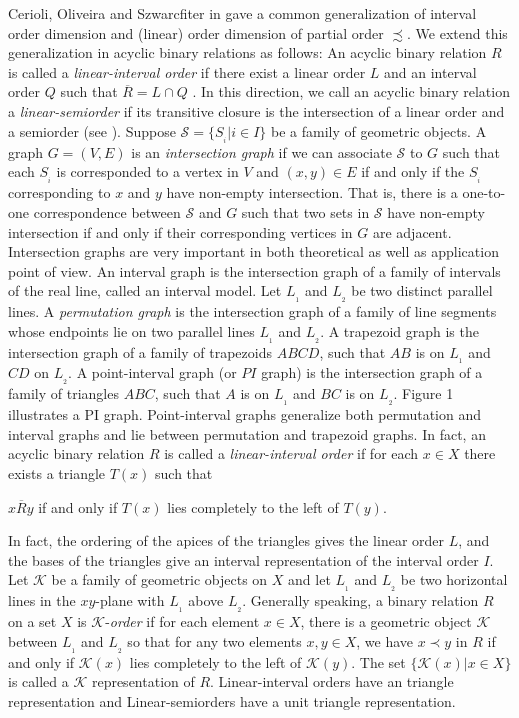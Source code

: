 \documentclass{article}
\theoremstyle{definition}
\begin{document}
Cerioli, Oliveira and Szwarcfiter in \cite{COS} gave a common generalization of
interval order dimension and (linear) order dimension of partial order $\precsim$. 
We extend this generalization in acyclic binary relations as follows: 
An acyclic binary relation $R$
is called a {\it linear-interval order} if there exist a linear order $L$ and an interval order $Q$ such that $\overline{R}=L\cap Q$ . 
In this direction,
we call an acyclic binary relation a {\it linear-semiorder} if its 
transitive closure is the intersection of a linear order and a semiorder (see \cite{tak2}).
Suppose $\mathcal{S}=\{S_{_i}\vert i\in I\}$ be a family of geometric objects.
A graph $G=(V,E)$ is an {\it intersection graph} if we can associate $\mathcal{S}$ to $G$
such that each $S_{_i}$ is corresponded to a vertex in $V$ and $(x, y)\in E$ if and only if the $S_{_i}$ corresponding to $x$ and $y$ have non-empty intersection. 
That is, there is a one-to-one correspondence between $\mathcal{S}$ and $G$ such that two sets in $\mathcal{S}$ have non-empty intersection if and only if their corresponding vertices in $G$ are adjacent.  
Intersection graphs are very important in both theoretical as well as application point of view. An interval graph is the intersection graph of a family of intervals of the real line, called an interval model. 
Let $L_{_1}$ and $L_{_2}$ be two distinct parallel lines. A {\it permutation graph} 
is the intersection graph of a family of line segments
whose endpoints lie on two parallel lines $L_{_1}$ and $L_{_2}$.
A trapezoid graph is the intersection graph of a family of trapezoids $ABCD$, such that $AB$ is on 
$L_{_1}$ and $CD$ on $L_{_2}$.
A point-interval graph (or $PI$ graph) is the intersection graph of 
a family of triangles $ABC$, such that $A$ is on $L_{_1}$ and $BC$ is on $L_{_2}$. 
Figure 1 illustrates a PI graph.
Point-interval graphs
generalize both permutation and interval graphs and
lie between permutation and trapezoid graphs.
In fact, an acyclic binary relation $R$ is called a {\it linear-interval order} if 
for each $x\in X$ there exists a 
triangle $T(x)$ such that
\begin{center}
$x\overline{R}y$ if and only if $T(x)$ lies completely to the left of $T(y)$.
\end{center}
In fact, the ordering of the apices of the triangles gives the linear order $L$, and the bases of the triangles give an interval representation of the interval order $I$.
Let $\mathcal{K}$ be a family of geometric objects on $X$ and
let $L_{_1}$ and $L_{_2}$ be two horizontal lines in the $xy$-plane with 
$L_{_1}$ above $L_{_2}$. 
Generally speaking, a binary relation $R$ on a set $X$ is $\mathcal{K}$-{\it order} 
if for each element $x\in X$, there is a geometric object $\mathcal{K}$
between $L_{_1}$ and $L_{_2}$ so that for any two elements $x, y\in X$, 
we have $x\prec y$ in $R$ if and only if $\mathcal{K}(x)$ lies completely to the left of 
$\mathcal{K}(y)$.
The set $\{\mathcal{K}(x)\vert x\in X\}$ is called a $\mathcal{K}$ representation of $R$. 
Linear-interval orders have an triangle representation and 
Linear-semiorders have a unit triangle representation.
\end{document}
